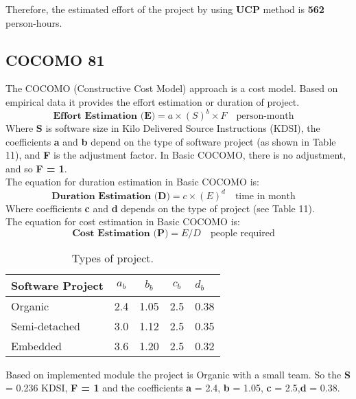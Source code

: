 \documentclass[12pt]{article}
\begin{document}
Therefore, the estimated effort of the project by using \textbf{UCP} method is \textbf{562} person-hours.

\subsection{COCOMO 81}
The COCOMO (Constructive Cost Model) approach is a cost model. Based on empirical data it provides the effort estimation or duration of project.
\begin{equation}
    \textbf{Effort Estimation (E)} = a\times (S)^{b}\times F \quad \textrm{person-month} \quad
\end{equation}
Where \textbf{S} is software size in Kilo Delivered Source Instructions (KDSI), the coefficients \textbf{a} and \textbf{b} depend on the type of software project (as shown in Table 11), and \textbf{F} is the adjustment factor. In Basic COCOMO, there is no adjustment, and so \textbf{F = 1}.\\

The equation for duration estimation in Basic COCOMO is:
\begin{equation}
    \textbf{Duration Estimation (D)} = c\times (E)^{d} \quad \textrm{time in month} \quad
\end{equation}
Where coefficients \textbf{c} and \textbf{d} depends on the type of project (see Table 11).\\

The equation for cost estimation in Basic COCOMO is: 
\begin{equation}
    \textbf{Cost Estimation (P)} = E/D \quad \textrm{people required} \quad
\end{equation}

\begin{table}[h]
\centering
\begin{tabular}{|l|l|l|l|l|}
\hline
\multicolumn{1}{|c|}{\textbf{Software Project}} & \multicolumn{1}{c|}{\textbf{$a_{b}$}} & \multicolumn{1}{c|}{\textbf{$b_{b}$}} & \multicolumn{1}{c|}{\textbf{$c_{b}$}} & \textbf{$d_{b}$} \\ \hline
Organic & 2.4 & 1.05 & 2.5 & 0.38 \\ \hline
Semi-detached & 3.0 & 1.12 & 2.5 & 0.35 \\ \hline
Embedded & 3.6 & 1.20 & 2.5 & 0.32 \\ \hline
\end{tabular}
\caption{Types of project.}
\end{table}
Based on implemented module the project is Organic with a small team. So the \textbf{S} = 0.236 KDSI, \textbf{F = 1} and the coefficients \textbf{a} = 2.4, \textbf{b} = 1.05, \textbf{c} = 2.5,\textbf{d} = 0.38.\\ 
\end{document}
